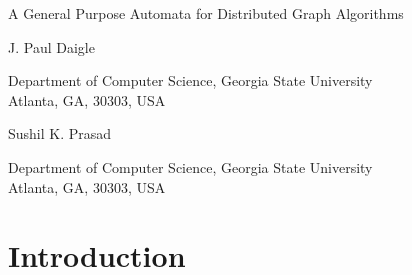 \documentclass[twoside]{article}
\newcommand{\jtitle}{A General Purpose Automata for Distributed Graph Algorithms}
\begin{document}
\thispagestyle{empty}
\copyrightheader

\begin{center}
\jtitle

\vspace{20pt}

J. Paul Daigle 

\vspace{2pt}

Department of Computer Science, Georgia State University\\
Atlanta, GA, 30303, USA

\vspace{10pt}
%
\vspace{10pt}
Sushil K. Prasad

\vspace{2pt}
Department of Computer Science, Georgia State University\\
Atlanta, GA, 30303, USA

\vspace{10pt}
%
%

\vspace{20pt}

\end{center}


\begin{abstract}
We present an automata for a compute node in a message passing model which allows a distributed computer to approximate solutions for three NP-Complete graph problems. Our algorithm for the Vertex Cover Problem uses $O(\log{\Delta)}$ communication rounds to find a 2-approximate solution. Our edge coloring algorithm is also 2-approximate and resolves in $O(\Delta)$ rounds, and we find a correct strong edge coloring of a symmetric digraph in $O(\Delta)$ rounds. All three algorithms require only one hop information to find correct solutions. 
\end{abstract}


\section{Introduction}

\end{document}
